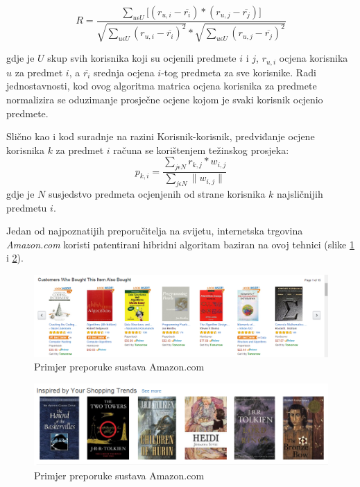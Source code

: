 \documentclass[times, utf8, diplomski, numeric]{fer}
\begin{document}
\begin{equation}
\label{eq:pearsonPredmet}
	R = \frac
			{\sum_{u \epsilon U} 
				\big[
					(r_{u,i} - \overline{r_i}) \ast
					(r_{u,j} - \overline{r_j})
				\big]
			}
			{
				\sqrt{{\sum_{u \epsilon U} (r_{u,i} - \overline{r_i})^2}} \ast 
				\sqrt{{\sum_{u \epsilon U} (r_{u,j} - \overline{r_j})^2}}
			}
\end{equation}

gdje je $U$ skup svih korisnika koji su ocjenili predmete $i$ i $j$, $r_{u,i}$
ocjena korisnika $u$ za predmet $i$, a $\overline{r_i}$ srednja ocjena $i$-tog
predmeta za sve korisnike. Radi jednostavnosti, kod ovog algoritma matrica
ocjena korisnika za predmete normalizira se oduzimanje prosječne ocjene
kojom je svaki korisnik ocjenio predmete. 

Slično kao i kod suradnje na razini Korisnik-korisnik, predviđanje ocjene
korisnika $k$ za predmet $i$ računa se korištenjem težinskog prosjeka:
\begin{equation}
\label{eq:tezinskiProsjek}
	p_{k,i} = 
		\frac
			{\sum_{j \epsilon N} r_{k,j} \ast w_{i,j}}
			{\sum_{j \epsilon N} \|w_{i,j}\|}
\end{equation}
gdje je $N$ susjedstvo predmeta ocjenjenih od strane korisnika $k$ najsličnijih
predmetu $i$.

Jedan od najpoznatijih preporučitelja na svijetu, internetska
trgovina \emph{Amazon.com} koristi patentirani hibridni algoritam baziran na
ovoj tehnici (slike \ref{fig:amazon1} i \ref{fig:amazon2}).
\begin{figure}[!htb]
	\centering
	\includegraphics[width=14.21cm]{images/collaborative/amazon.png}
	\caption{Primjer preporuke sustava \glqq Amazon.com\grqq}
	\label{fig:amazon1}
\end{figure}

\begin{figure}[!htb]
	\centering
	\includegraphics[width=14.21cm]{images/collaborative/amazon2.png}
	\caption{Primjer preporuke sustava \glqq Amazon.com\grqq}
	\label{fig:amazon2}
\end{figure}
\end{document}
